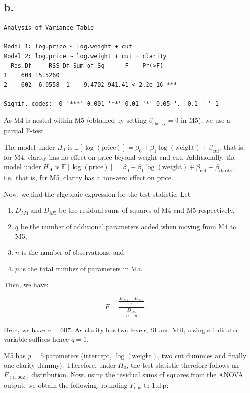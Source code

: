 \documentclass[
  11pt,
]{article}
\begin{document}
\subsection{b.}\label{b.-2}

\begin{verbatim}
Analysis of Variance Table

Model 1: log.price ~ log.weight + cut
Model 2: log.price ~ log.weight + cut + clarity
  Res.Df     RSS Df Sum of Sq      F    Pr(>F)    
1    603 15.5260                                  
2    602  6.0558  1    9.4702 941.41 < 2.2e-16 ***
---
Signif. codes:  0 '***' 0.001 '**' 0.01 '*' 0.05 '.' 0.1 ' ' 1
\end{verbatim}

As M4 is nested within M5 (obtained by setting
\(\beta_{\text{clarity}} = 0\) in M5), we use a partial F-test.

The model under \(H_0\) is
\(\mathbb{E}[\log(\text{price})] = \beta_0 + \beta_1 \log(\text{weight}) + \beta_{\text{cut}}\),
that is, for M4, clarity has no effect on price beyond weight and cut.
Additionally, the model under \(H_A\) is
\(\mathbb{E}[\log(\text{price})] = \beta_0 + \beta_1 \log(\text{weight}) + \beta_{\text{cut}} + \beta_{\text{clarity}}\),
i.e.~that is, for M5, clarity has a non-zero effect on price.

Now, we find the algebraic expression for the test statistic. Let

\begin{enumerate}
\def\labelenumi{\arabic{enumi}.}
\item
  \(D_{M4}\) and \(D_{M5}\) be the residual sums of squares of M4 and M5
  respectively,
\item
  \(q\) be the number of additional parameters added when moving from M4
  to M5,
\item
  \(n\) is the number of observations, and
\item
  \(p\) is the total number of parameters in M5.
\end{enumerate}

Then, we have:

\[
  F = \frac{\frac{D_{M4} - D_{M5}}{q}}{\frac{D_{M5}}{n - p}}.
\]

Here, we have \(n = 607\). As clarity has two levels, SI and VSI, a
single indicator variable suffices hence \(q = 1\).

M5 has \(p = 5\) parameters (intercept, \(\log(\text{weight})\), two cut
dummies and finally one clarity dummy). Therefore, under \(H_0\), the
test statistic therefore follows an \(F_{(1,\, 602)}\) distribution.
Now, using the residual sums of squares from the ANOVA output, we obtain
the following, rounding \(F_{\text{obs}}\) to 1.d.p:
\end{document}

